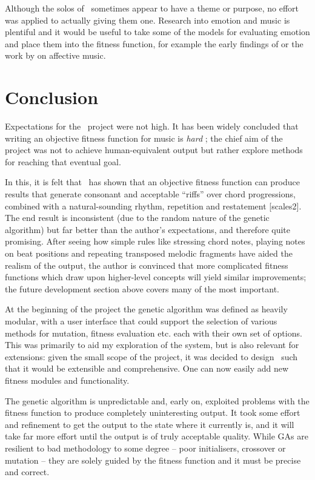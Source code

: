 Although the solos of \jg\ sometimes appear to have a theme or purpose, no effort was applied to actually giving them one. Research into emotion and music is plentiful and it would be useful to take some of the models for evaluating emotion and place them into the fitness function, for example the early findings of \cite{hevner36,hevner37} or the work by \cite{kim04} on affective music.

\section{Conclusion}

Expectations for the \jg\ project were not high. It has been widely concluded that writing an
objective fitness function for music is \emph{hard} \citep{papadopoulos98,jin05,unehara03}; the
chief aim of the project was not to achieve human-equivalent output but rather explore methods
for reaching that eventual goal.

In this, it is felt that \jg\ has shown that an objective fitness function can produce results that
generate consonant and acceptable ``riffs'' over chord progressions, combined with a natural-sounding
rhythm, repetition and restatement [scales2]. The end result is inconsistent (due to the random nature of
the genetic algorithm) but far better than the author's expectations, and therefore quite promising.
After seeing how simple rules like stressing chord notes, playing notes on beat positions and 
repeating transposed melodic fragments have aided the realism of the output, the author is convinced
that more complicated fitness functions which draw upon higher-level concepts will yield similar
improvements; the future development section above covers many of the most important.

At the beginning of the project the genetic algorithm was defined as heavily modular, with a 
user interface that could support the selection of various methods for mutation, fitness evaluation
etc. each with their own set of options. This was primarily to aid my exploration of the system,
but is also relevant for extensions: given the small scope of the project, it was decided to design
\jg\ such that it would be extensible and comprehensive. One can now easily add new fitness modules and
functionality.

The genetic algorithm is unpredictable and, early on, exploited problems with the fitness function
to produce completely uninteresting output. It took some effort and refinement to get the output
to the state where it currently is, and it will take far more effort until the output is of
truly acceptable quality. While GAs are resilient to bad methodology to some degree -- poor
initialisers, crossover or mutation -- they are solely guided by the fitness function and it must
be precise and correct.

